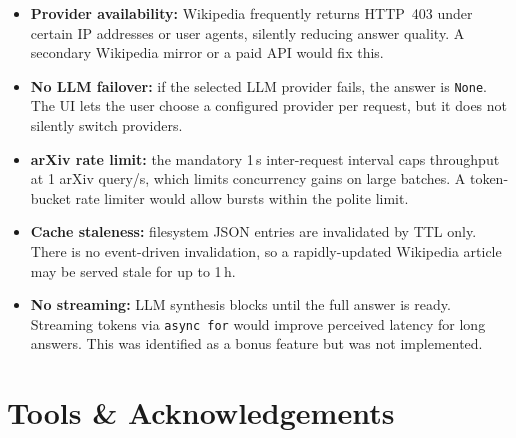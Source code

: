 \documentclass[11pt,a4paper]{article}
\begin{document}
\begin{itemize}
  \item \textbf{Provider availability:} Wikipedia frequently returns HTTP~403 under certain IP addresses or user agents, silently reducing answer quality. A secondary Wikipedia mirror or a paid API would fix this.
  \item \textbf{No LLM failover:} if the selected LLM provider fails, the answer is \texttt{None}. The UI lets the user choose a configured provider per request, but it does not silently switch providers.
  \item \textbf{arXiv rate limit:} the mandatory 1\,s inter-request interval caps throughput at 1 arXiv query/s, which limits concurrency gains on large batches. A token-bucket rate limiter would allow bursts within the polite limit.
  \item \textbf{Cache staleness:} filesystem JSON entries are invalidated by TTL only. There is no event-driven invalidation, so a rapidly-updated Wikipedia article may be served stale for up to 1\,h.
  \item \textbf{No streaming:} LLM synthesis blocks until the full answer is ready. Streaming tokens via \texttt{async for} would improve perceived latency for long answers. This was identified as a bonus feature but was not implemented.
\end{itemize}

\section{Tools \& Acknowledgements}\label{sec:tools}
\end{document}
